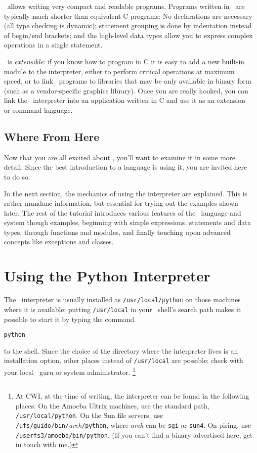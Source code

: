 \Python\ allows writing very compact and readable programs.
Programs written in \Python\ are typically much shorter than equivalent C
programs:
No declarations are necessary (all type checking is
dynamic); statement grouping is done by indentation instead of begin/end
brackets; and the high-level data types allow you to express complex
operations in a single statement.

\Python\ is
{\it extensible}:
if you know how to program in C it is easy to add a new built-in module
to the interpreter, either to perform critical operations at maximum
speed, or to link \Python\ programs to libraries that may be only available
in binary form (such as a vendor-specific graphics library).
Once you are really hooked, you can link the \Python\ interpreter into an
application written in C and use it as an extension or command language.

\subsection{Where From Here}

Now that you are all excited about \Python, you'll want to examine it in
some more detail.
Since the best introduction to a language is using it, you are invited
here to do so.

In the next section, the mechanics of using the interpreter are
explained.
This is rather mundane information, but essential for trying out the
examples shown later.
The rest of the tutorial introduces various features of the \Python\
language and system though examples, beginning with simple expressions,
statements and data types, through functions and modules, and finally
touching upon advanced concepts like exceptions and classes.

\section{Using the Python Interpreter}

The \Python\ interpreter is usually installed as
{\tt /usr/local/python}
on those machines where it is available; putting
{\tt /usr/local}
in your \UNIX\ shell's search path makes it possible to start it by
typing the command
\begin{code}\begin{verbatim}
python
\end{verbatim}\end{code}
to the shell.
Since the choice of the directory where the interpreter lives is an
installation option, other places instead of
{\tt /usr/local}
are possible; check with your local \Python\ guru or system
administrator.%
\footnote{
	At CWI, at the time of writing, the interpreter can be found in
	the following places:
	On the Amoeba Ultrix machines, use the standard path,
	{\tt /usr/local/python}.
	On the Sun file servers, use
	{\tt /ufs/guido/bin/}{\it arch}{\tt /python},
	where {\it arch} can be {\tt sgi} or {\tt sun4}.
	On piring, use {\tt /userfs3/amoeba/bin/python}.
	(If you can't find a binary advertised here, get in touch with me.)
}

